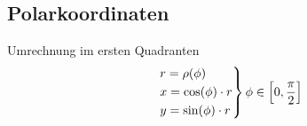\subsection{Polarkoordinaten}
    Umrechnung im ersten Quadranten
    \begin{align*}
        \begin{rcases}
            r = \rho(\phi)\\
            x = \cos(\phi) \cdot r\\
            y = \sin(\phi) \cdot r
        \end{rcases} \phi \in \left[0, \frac{\pi}{2}\right]
    \end{align*}